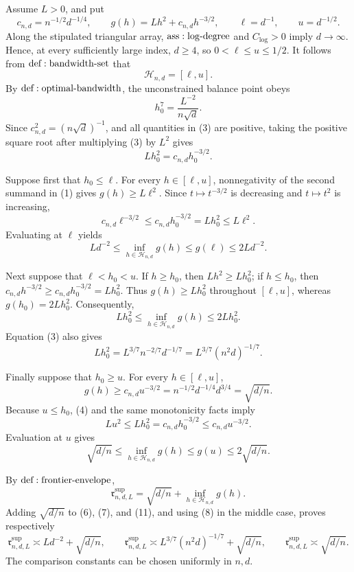 Assume \(L>0\), and put
\[
 c_{n,d}=n^{-1/2}d^{-1/4},
 \qquad g(h)=Lh^2+c_{n,d}h^{-3/2},
 \qquad \ell=d^{-1},
 \qquad u=d^{-1/2}.
\tag{1}
\]
Along the stipulated triangular array, \({\rm ass:log\text{-}degree}\) and \(C_{\log}>0\) imply \(d\to\infty\).  Hence, at every sufficiently large index, \(d\geq4\), so \(0<\ell\leq u\leq1/2\).  It follows from \({\rm def:bandwidth\text{-}set}\) that
\[
 \mathcal H_{n,d}=[\ell,u].
\tag{2}
\]
By \({\rm def:optimal\text{-}bandwidth}\), the unconstrained balance point obeys
\[
 h_0^7=\frac{L^{-2}}{n\sqrt d}.
\tag{3}
\]
Since \(c_{n,d}^2=(n\sqrt d)^{-1}\), and all quantities in (3) are positive, taking the positive square root after multiplying (3) by \(L^2\) gives
\[
 Lh_0^2=c_{n,d}h_0^{-3/2}.
\tag{4}
\]

Suppose first that \(h_0\leq\ell\).  For every \(h\in[\ell,u]\), nonnegativity of the second summand in (1) gives \(g(h)\geq L\ell^2\).  Since \(t\mapsto t^{-3/2}\) is decreasing and \(t\mapsto t^2\) is increasing,
\[
 c_{n,d}\ell^{-3/2}
 \leq c_{n,d}h_0^{-3/2}
 =Lh_0^2
 \leq L\ell^2.
\tag{5}
\]
Evaluating at \(\ell\) yields
\[
 Ld^{-2}
 \leq\inf_{h\in\mathcal H_{n,d}}g(h)
 \leq g(\ell)
 \leq2Ld^{-2}.
\tag{6}
\]

Next suppose that \(\ell<h_0<u\).  If \(h\geq h_0\), then \(Lh^2\geq Lh_0^2\); if \(h\leq h_0\), then \(c_{n,d}h^{-3/2}\geq c_{n,d}h_0^{-3/2}=Lh_0^2\).  Thus \(g(h)\geq Lh_0^2\) throughout \([\ell,u]\), whereas \(g(h_0)=2Lh_0^2\).  Consequently,
\[
 Lh_0^2
 \leq\inf_{h\in\mathcal H_{n,d}}g(h)
 \leq2Lh_0^2.
\tag{7}
\]
Equation (3) also gives
\[
 Lh_0^2=L^{3/7}n^{-2/7}d^{-1/7}
 =L^{3/7}(n^2d)^{-1/7}.
\tag{8}
\]

Finally suppose that \(h_0\geq u\).  For every \(h\in[\ell,u]\),
\[
 g(h)\geq c_{n,d}u^{-3/2}
 =n^{-1/2}d^{-1/4}d^{3/4}
 =\sqrt{d/n}.
\tag{9}
\]
Because \(u\leq h_0\), (4) and the same monotonicity facts imply
\[
 Lu^2\leq Lh_0^2=c_{n,d}h_0^{-3/2}
 \leq c_{n,d}u^{-3/2}.
\tag{10}
\]
Evaluation at \(u\) gives
\[
 \sqrt{d/n}
 \leq\inf_{h\in\mathcal H_{n,d}}g(h)
 \leq g(u)
 \leq2\sqrt{d/n}.
\tag{11}
\]

By \({\rm def:frontier\text{-}envelope}\),
\[
 \mathfrak r^{\mathrm{sup}}_{n,d,L}
 =\sqrt{d/n}+\inf_{h\in\mathcal H_{n,d}}g(h).
\tag{12}
\]
Adding \(\sqrt{d/n}\) to (6), (7), and (11), and using (8) in the middle case, proves respectively
\[
 \mathfrak r^{\mathrm{sup}}_{n,d,L}
 \asymp Ld^{-2}+\sqrt{d/n},
 \qquad
 \mathfrak r^{\mathrm{sup}}_{n,d,L}
 \asymp L^{3/7}(n^2d)^{-1/7}+\sqrt{d/n},
 \qquad
 \mathfrak r^{\mathrm{sup}}_{n,d,L}\asymp\sqrt{d/n}.
\tag{13}
\]
The comparison constants can be chosen uniformly in \(n,d\).

